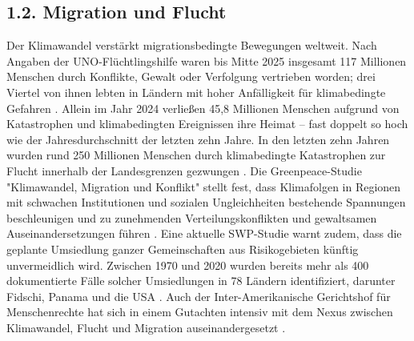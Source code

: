 \documentclass[12pt, a4paper]{article}
\begin{document}
	\subsection*{1.2. Migration und Flucht}
	Der Klimawandel verstärkt migrationsbedingte Bewegungen weltweit. Nach Angaben der
	UNO-Flüchtlingshilfe waren bis Mitte 2025 insgesamt 117 Millionen Menschen durch
	Konflikte, Gewalt oder Verfolgung vertrieben worden; drei Viertel von ihnen lebten in
	Ländern mit hoher Anfälligkeit für klimabedingte Gefahren \cite{unhcr2025}. Allein
	im Jahr 2024 verließen 45,8 Millionen Menschen aufgrund von Katastrophen und
	klimabedingten Ereignissen ihre Heimat – fast doppelt so hoch wie der Jahresdurchschnitt
	der letzten zehn Jahre. In den letzten zehn Jahren wurden rund 250 Millionen Menschen
	durch klimabedingte Katastrophen zur Flucht innerhalb der Landesgrenzen gezwungen
	\cite{idmc2025}. Die Greenpeace-Studie "Klimawandel, Migration und Konflikt" stellt
	fest, dass Klimafolgen in Regionen mit schwachen Institutionen und sozialen
	Ungleichheiten bestehende Spannungen beschleunigen und zu zunehmenden
	Verteilungskonflikten und gewaltsamen Auseinandersetzungen führen \cite{greenpeace2025}.
	Eine aktuelle SWP-Studie warnt zudem, dass die geplante Umsiedlung ganzer
	Gemeinschaften aus Risikogebieten künftig unvermeidlich wird. Zwischen 1970 und 2020
	wurden bereits mehr als 400 dokumentierte Fälle solcher Umsiedlungen in 78 Ländern
	identifiziert, darunter Fidschi, Panama und die USA \cite{swp2025}. Auch der
	Inter-Amerikanische Gerichtshof für Menschenrechte hat sich in einem Gutachten
	intensiv mit dem Nexus zwischen Klimawandel, Flucht und Migration auseinandergesetzt
	\cite{iachr2025}.
	
\end{document}
